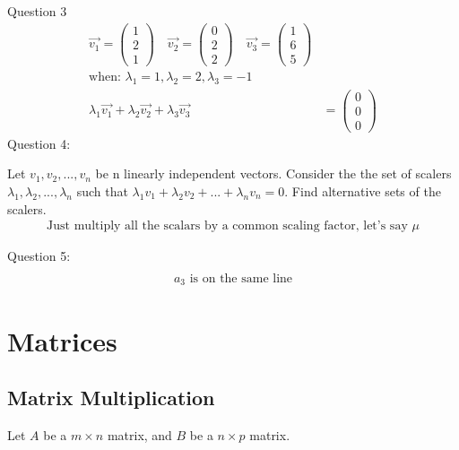 \documentclass{article}
\begin{document}
Question 3
\begin{align}
    \vec{v_1} = \begin{pmatrix} 1 \\ 2 \\ 1 \end{pmatrix} \quad \vec{v_2} = \begin{pmatrix} 0 \\ 2 \\ 2 \end{pmatrix} \quad \vec{v_3} = \begin{pmatrix} 1 \\ 6 \\ 5 \end{pmatrix} \\
    \textrm{when: } \lambda_1 = 1, \lambda_2 = 2, \lambda_3 = -1                                                                                                                  \\
    \lambda_1 \vec{v_1} + \lambda_2 \vec{v_2} + \lambda_3 \vec{v_3} & = \begin{pmatrix} 0 \\ 0 \\ 0 \end{pmatrix}
\end{align}
Question 4:

Let $v_1, v_2, ..., v_n$ be n linearly independent vectors.
Consider the the set of scalers $\lambda_1, \lambda_2, ..., \lambda_n$ such that $\lambda_1 v_1 + \lambda_2 v_2 + ... + \lambda_n v_n = 0$.
Find alternative sets of the scalers.
\begin{align*}
    \textrm{Just multiply all the scalars by a common scaling factor, let's say } \mu
\end{align*}

Question 5:
\begin{align*}
    \textrm{} \\
    a_3 \textrm{ is on the same line}
\end{align*}

\newpage
\section{Matrices}


\subsection{Matrix Multiplication}

Let $A$ be a $m \times n$ matrix, and $B$ be a $n \times p$ matrix.
\end{document}
